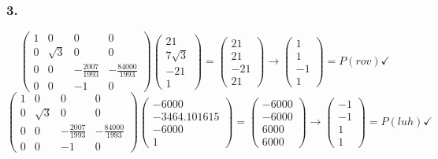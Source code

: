 \documentclass{article}
\begin{document}
\subsubsection*{3.}
\[
    \begin{pmatrix}
        1 & 0        & 0                  & 0                   \\
        0 & \sqrt{3} & 0                  & 0                   \\
        0 & 0        & -\frac{2007}{1993} & -\frac{84000}{1993} \\
        0 & 0        & -1                 & 0
    \end{pmatrix}
    \begin{pmatrix}
        21        \\
        7\sqrt{3} \\
        -21       \\
        1
    \end{pmatrix}=
    \begin{pmatrix}
        21  \\
        21  \\
        -21 \\
        21
    \end{pmatrix}\rightarrow
    \begin{pmatrix}
        1 \\1\\-1\\1
    \end{pmatrix}=P(rov)\checkmark
\]
\[
    \begin{pmatrix}
        1 & 0        & 0                  & 0                   \\
        0 & \sqrt{3} & 0                  & 0                   \\
        0 & 0        & -\frac{2007}{1993} & -\frac{84000}{1993} \\
        0 & 0        & -1                 & 0
    \end{pmatrix}
    \begin{pmatrix}
        -6000        \\
        -3464.101615 \\
        -6000        \\
        1
    \end{pmatrix}=
    \begin{pmatrix}
        -6000 \\
        -6000 \\
        6000  \\
        6000
    \end{pmatrix}\rightarrow
    \begin{pmatrix}
        -1 \\-1\\1\\1
    \end{pmatrix}=P(luh)\checkmark
\]
\end{document}
